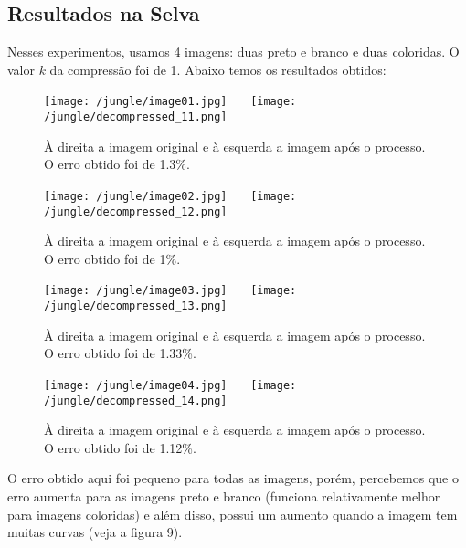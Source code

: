 \documentclass{article}
\begin{document}
		\subsection{Resultados na Selva}
		Nesses experimentos, usamos 4 imagens: duas preto e branco e duas coloridas. O valor $k$ da compressão foi de 1. Abaixo temos os resultados obtidos:
		\begin{figure}[H]
			\centering
			\captionsetup{justification=centering}
			\texttt{[image: /jungle/image01.jpg]} \ \ \
			\texttt{[image: /jungle/decompressed\_11.png]} \\
			\caption{À direita a imagem original e à esquerda a imagem após o processo. O erro obtido foi de 1.3\%.}  
		\end{figure}\par
		\begin{figure}[H]
			\centering
			\captionsetup{justification=centering}
			\texttt{[image: /jungle/image02.jpg]} \ \ \
			\texttt{[image: /jungle/decompressed\_12.png]} \\
			\caption{À direita a imagem original e à esquerda a imagem após o processo. O erro obtido foi de 1\%.}  
		\end{figure}\par
		\begin{figure}[H]
			\centering
			\captionsetup{justification=centering}
			\texttt{[image: /jungle/image03.jpg]} \ \ \
			\texttt{[image: /jungle/decompressed\_13.png]} \\
			\caption{À direita a imagem original e à esquerda a imagem após o processo. O erro obtido foi de 1.33\%.}  
		\end{figure}\par
		\begin{figure}[H]
			\centering
			\captionsetup{justification=centering}
			\texttt{[image: /jungle/image04.jpg]} \ \ \
			\texttt{[image: /jungle/decompressed\_14.png]} \\
			\caption{À direita a imagem original e à esquerda a imagem após o processo. O erro obtido foi de 1.12\%.}  
		\end{figure}\par
		O erro obtido aqui foi pequeno para todas as imagens, porém, percebemos que o erro aumenta para as imagens preto e branco (funciona relativamente melhor para imagens coloridas) e além disso, possui um aumento quando a imagem tem muitas curvas (veja a figura 9).\par
\end{document}
